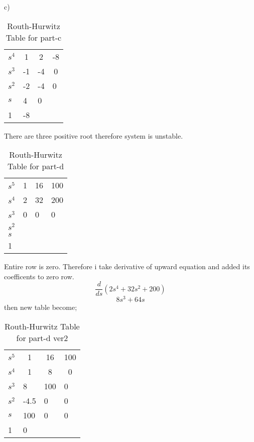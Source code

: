 \documentclass[11pt]{article}
\begin{document}
c)
\begin{table}[H]
\centering
\caption{Routh-Hurwitz Table for part-c}
\label{my-label}
\begin{tabular}{llll}
$s^4$ & \multicolumn{1}{c}{1}  & \multicolumn{1}{c}{2}  & \multicolumn{1}{c}{-8} \\
$s^3$ & \multicolumn{1}{c}{-1} & \multicolumn{1}{c}{-4} & \multicolumn{1}{c}{0}  \\
$s^2$ & -2                     & -4                     & 0                      \\
$s$   & 4                      & 0                      &                        \\
1     & -8                     &                        &                       
\end{tabular}
\end{table}
There are three positive root therefore system is unstable.
\begin{table}[H]
\centering
\caption{Routh-Hurwitz Table for part-d}
\label{my}
\begin{tabular}{llll}
$s^5$ & \multicolumn{1}{c}{1} & \multicolumn{1}{c}{16} & \multicolumn{1}{c}{100} \\
$s^4$ & \multicolumn{1}{c}{2} & \multicolumn{1}{c}{32} & \multicolumn{1}{c}{200} \\
$s^3$ & 0                     & 0                      & 0                       \\
$s^2$ &                       &                        &                         \\
$s$   &                       &                        &                         \\
1     &                       &                        &                        
\end{tabular}
\end{table}
Entire row is zero. Therefore i take derivative of upward equation and added its coefficents to zero row.
\[\frac{d}{ds}(2s^4+32s^2+200)\]
\[8s^3+64s\]
then new table become;
\begin{table}[H]
\centering
\caption{Routh-Hurwitz Table for part-d ver2}
\label{my-lael}
\begin{tabular}{llll}
$s^5$ & \multicolumn{1}{c}{1} & \multicolumn{1}{c}{16} & \multicolumn{1}{c}{100} \\
$s^4$ & \multicolumn{1}{c}{1} & \multicolumn{1}{c}{8}  & \multicolumn{1}{c}{0}   \\
$s^3$ & 8                     & 100                    & 0                       \\
$s^2$ & -4.5                  & 0                      & 0                       \\
$s$   & 100                   & 0                      & 0                       \\
1     & 0                     &                        &                        
\end{tabular}
\end{table}
\end{document}

